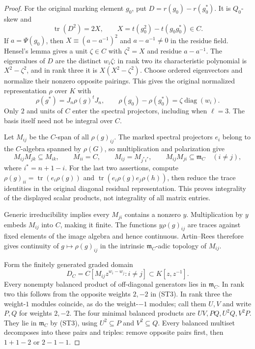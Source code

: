 \begin{proof}
For the original marking element $g_0$, put
$D=r(g_0)-r(g_0^*)$. It is $Q_0$-skew and
\[
 \operatorname{tr}(D^2)=2X,
 \qquad X=t(g_0^2)-t(g_0g_0^*)\in C.
\]
If $a=\Psi(g_0)$, then $X\equiv(a-a^{-1})^2$ and
$a-a^{-1}\ne0$ in the residue field. Hensel's lemma gives a unit
$\zeta\in C$ with $\zeta^2=X$ and residue $a-a^{-1}$.
The eigenvalues of $D$ are the distinct $w_i\zeta$: in rank two
its characteristic polynomial is $X^2-\zeta^2$, and in rank three
it is $X(X^2-\zeta^2)$. Choose ordered eigenvectors and normalize
their nonzero opposite pairings. This gives the original normalized
representation $\rho$ over $K$ with
\[
 \rho(g^*)=J_n\rho(g)^tJ_n,
 \qquad \rho(g_0)-\rho(g_0^*)=\zeta\operatorname{diag}(w_i).
                                                        \tag{ST2}
\]
Only $2$ and units of $C$ enter the spectral projectors, including
when $\ell=3$. The basis itself need not be integral over $C$.

Let $M_{ij}$ be the $C$-span of all $\rho(g)_{ij}$. The marked
spectral projectors $e_i$ belong to the $C$-algebra spanned by $\rho(G)$,
so multiplication and polarization give
\[
 M_{ij}M_{jk}\subseteq M_{ik},\qquad
 M_{ii}=C,\qquad M_{ij}=M_{j^*i^*},\qquad
 M_{ij}M_{ji}\subseteq\mathfrak m_C\quad(i\ne j),       \tag{ST3}
\]
where $i^*=n+1-i$. For the last two assertions, compute
$\rho(g)_{ii}=\operatorname{tr}(e_i\rho(g))$ and
$\operatorname{tr}(e_i\rho(g)e_j\rho(h))$, then reduce the trace
identities in the original diagonal residual representation.
This proves integrality of the displayed scalar products, not
integrality of all matrix entries.

Generic irreducibility implies every $M_{ji}$ contains a nonzero
$y$. Multiplication by $y$ embeds $M_{ij}$ into $C$, making it
finite. The functions $y\rho(g)_{ij}$ are traces against fixed
elements of the image algebra and hence continuous. Artin--Rees
therefore gives continuity of $g\mapsto\rho(g)_{ij}$ in the
intrinsic $\mathfrak m_C$-adic topology of $M_{ij}$.

Form the finitely generated graded domain
\[
 D_C=C[M_{ij}z^{w_i-w_j}:i\ne j]\subset K[z,z^{-1}].
\]
Every nonempty balanced product of off-diagonal generators lies
in $\mathfrak m_C$. In rank two this follows from the opposite
weights $2,-2$ in (ST3). In rank three the weight-$1$ modules
coincide, as do the weight-$-1$ modules; call them $U,V$ and
write $P,Q$ for weights $2,-2$. The four minimal balanced products
are $UV,PQ,U^2Q,V^2P$. They lie in $\mathfrak m_C$ by (ST3),
using $U^2\subseteq P$ and $V^2\subseteq Q$.
Every balanced multiset decomposes into these pairs and triples:
remove opposite pairs first, then $1+1-2$ or $2-1-1$.


\end{proof}
